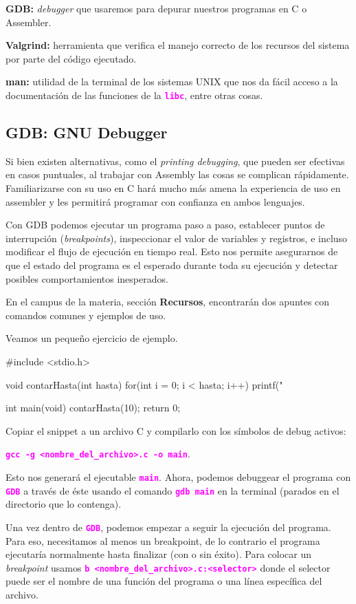 \documentclass[]{scrartcl}
\newcommand{\hl}[1]{\textcolor{magenta}{\textbf{\texttt{#1}}}}
\begin{document}
\textbf{GDB:} \textit{debugger} que usaremos para depurar nuestros programas en C o Assembler.

\textbf{Valgrind:} herramienta que verifica el manejo correcto de los recursos del sistema por parte del código ejecutado.

\textbf{man:} utilidad de la terminal de los sistemas UNIX que nos da fácil acceso a la documentación de las funciones de la \hl{libc}, entre otras cosas.

\subsection*{GDB: GNU Debugger}

Si bien existen alternativas, como el \textit{printing debugging}, que pueden ser efectivas en casos puntuales, al trabajar con Assembly las cosas se complican rápidamente.
Familiarizarse con su uso en C hará mucho más amena la experiencia de uso en assembler y les permitirá programar con confianza en ambos lenguajes.

Con GDB podemos ejecutar un programa paso a paso, establecer puntos de interrupción (\textit{breakpoints}), inspeccionar el valor de variables y registros, e incluso modificar el flujo de ejecución en tiempo real.
Esto nos permite asegurarnos de que el estado del programa es el esperado durante toda su ejecución y detectar posibles comportamientos inesperados.

En el campus de la materia, sección \textbf{Recursos}, encontrarán dos apuntes con comandos comunes y ejemplos de uso.

Veamos un pequeño ejercicio de ejemplo.

\begin{cbox}[unbreakable]{}
#include <stdio.h>

void contarHasta(int hasta){
  for(int i = 0; i < hasta; i++){
    printf("%
  }
}

int main(void){
  contarHasta(10);
  return 0;
}
\end{cbox}

Copiar el snippet a un archivo C y compilarlo con los símbolos de debug activos: 

\hl{gcc -g <nombre\_del\_archivo>.c -o main}.

Esto nos generará el ejecutable \hl{main}.
Ahora, podemos debuggear el programa con \hl{GDB} a través de éste usando el comando \hl{gdb main} en la terminal (parados en el directorio que lo contenga).

Una vez dentro de \hl{GDB}, podemos empezar a seguir la ejecución del programa. Para eso, necesitamos al menos un breakpoint, de lo contrario el programa ejecutaría normalmente hasta finalizar (con o sin éxito). 
Para colocar un \textit{breakpoint} usamos \hl{b <nombre\_del\_archivo>.c:<selector>} donde el selector puede ser el nombre de una función del programa o una línea específica del archivo.
\end{document}
